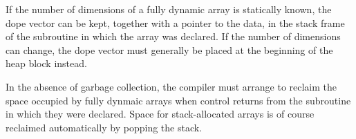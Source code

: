 \vskip 6pt
If the number of dimensions of a fully dynamic array is statically known, the dope vector can be kept, together with a pointer to the data, in the stack frame of the subroutine in which the array was declared. If the number of dimensions can change, the dope vector must generally be placed at the beginning of the heap block instead.

\vskip 6pt
In the absence of garbage collection, the compiler must arrange to reclaim the space occupied by fully dynmaic arrays when control returns from the subroutine in which they were declared. Space for stack-allocated arrays is of course reclaimed automatically by popping the stack.

\vfill\eject
\bye
